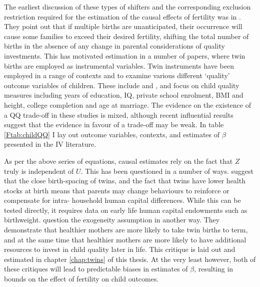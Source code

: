 The earliest discussion of these types of shifters and the corresponding 
exclusion restriction required for the estimation of the causal effects of 
fertility was in \citet{RosenzweigWolpin1980}. They point out that if multiple 
births are unanticipated, their occurrence will cause some families to exceed 
their desired fertility, shifting the total number of births in the absence of 
any change in parental considerations of quality investments. This has motivated 
estimation in a number of papers, where twin births are employed as instrumental 
variables.  Twin instruments have been employed in a range of contexts and
to examine various different `quality' outcome variables of children. These 
include \citet{Blacketal2005,Caceres2006,Lietal2008,Dayiogluetal2009,Sanhueza2009,
Blacketal2010,Angristetal2010,FitzsimonsMalde2010} and \citet{SouzaPonczek2012}, 
and focus on child quality measures including years of education, IQ, private 
school enrolment, BMI and height, college completion and age at marriage.  The 
evidence on the existence of a QQ trade-off in these studies is mixed, 
although recent influential results suggest that the evidence in favour of a 
trade-off may be weak.  In table \ref{Ftab:childQQ} I lay out outcome variables, 
contexts, and estimates of $\beta$ presented in the IV literature.

As per the above series of equations, causal estimates rely on the fact that
$Z$ truly is independent of $U$.  This has been questioned in a number of ways.
\citet{RosenzweigZhang2009} suggest that the close birth-spacing of twins, and 
the fact that twins have lower health stocks at birth \citep{Almondetal2005}
means that parents may change behaviours to reinforce or compensate for intra-%
household human capital differences.  While this can be tested directly, it 
requires data on early life human capital endowments such as birthweight.  
\citet{BhalotraClarke2015} question the exogeneity assumption in another way.
They demonstrate that healthier mothers are more likely to take twin births
to term, and at the same time that healthier mothers are more likely to have
additional resources to invest in child quality later in life.  This critique is
laid out and estimated in chapter \ref{chap:twins} of this thesis.  At the very
least however, both of these critiques will lead to predictable biases in 
estimates of $\beta$, resulting in bounds on the effect of fertility on child
outcomes.

